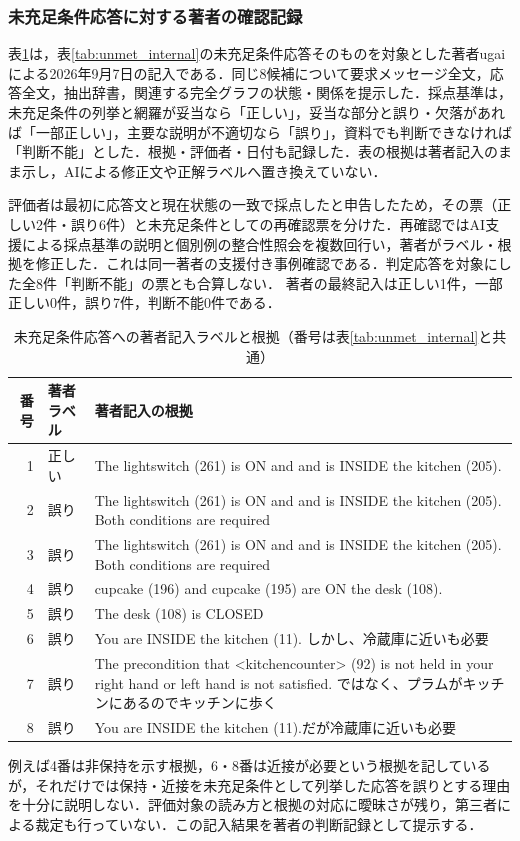 \subsubsection{未充足条件応答に対する著者の確認記録}\label{app:author_unmet_review}
表\ref{tab:author_unmet_review}は，表\ref{tab:unmet_internal}の未充足条件応答そのものを対象とした著者ugaiによる2026年9月7日の記入である．同じ8候補について要求メッセージ全文，応答全文，抽出辞書，関連する完全グラフの状態・関係を提示した．採点基準は，未充足条件の列挙と網羅が妥当なら「正しい」，妥当な部分と誤り・欠落があれば「一部正しい」，主要な説明が不適切なら「誤り」，資料でも判断できなければ「判断不能」とした．根拠・評価者・日付も記録した．表の根拠は著者記入のまま示し，AIによる修正文や正解ラベルへ置き換えていない．

評価者は最初に応答文と現在状態の一致で採点したと申告したため，その票（正しい2件・誤り6件）と未充足条件としての再確認票を分けた．再確認ではAI支援による採点基準の説明と個別例の整合性照会を複数回行い，著者がラベル・根拠を修正した．これは同一著者の支援付き事例確認である．判定応答を対象にした全8件「判断不能」の票とも合算しない．
著者の最終記入は正しい1件，一部正しい0件，誤り7件，判断不能0件である．
\begin{table}[tb]
\caption{未充足条件応答への著者記入ラベルと根拠（番号は表\ref{tab:unmet_internal}と共通）}\label{tab:author_unmet_review}
\centering\small
\begin{tabular}{rlp{}}
\hline
番号 & 著者ラベル & 著者記入の根拠 \\
\hline
1 & 正しい & The lightswitch (261) is ON and and is INSIDE the kitchen (205). \\
2 & 誤り & The lightswitch (261) is ON and and is INSIDE the kitchen (205). Both conditions are required \\
3 & 誤り & The lightswitch (261) is ON and and is INSIDE the kitchen (205). Both conditions are required \\
4 & 誤り & cupcake (196) and cupcake (195) are ON the desk (108). \\
5 & 誤り & The desk (108) is CLOSED \\
6 & 誤り & You are INSIDE the kitchen (11). しかし、冷蔵庫に近いも必要 \\
7 & 誤り & The precondition that \textless{}kitchencounter\textgreater{} (92) is not held in your right hand or left hand is not satisfied. ではなく、プラムがキッチンにあるのでキッチンに歩く \\
8 & 誤り & You are INSIDE the kitchen (11).だが冷蔵庫に近いも必要 \\
\hline
\end{tabular}
\end{table}

例えば4番は非保持を示す根拠，6・8番は近接が必要という根拠を記しているが，それだけでは保持・近接を未充足条件として列挙した応答を誤りとする理由を十分に説明しない．評価対象の読み方と根拠の対応に曖昧さが残り，第三者による裁定も行っていない．この記入結果を著者の判断記録として提示する．
